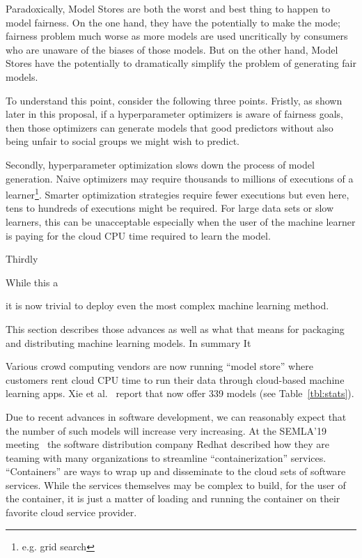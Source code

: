 \documentclass{NSF}
\newcommand{\tbl}[1]{Table~\ref{tbl:#1}}
\begin{document}
\begin{nsfdescription}
Paradoxically,   Model Stores are both the worst and best thing to happen to model fairness. On the one hand, they have the potentially to make the mode; fairness problem much worse as more models are used uncritically
by consumers who are unaware of the biases of those models.
But on the other hand, Model Stores have the potentially to dramatically simplify the problem of generating fair models. 

To understand this point, consider the following three points.
Fristly, as shown later in this proposal, if a hyperparameter optimizers
is aware of fairness goals, then those optimizers can generate models
that good predictors without also being unfair to social groups we might wish to predict.

Secondly,  hyperparameter optimization slows down the process of model generation. Naive optimizers may require thousands to millions of executions of a learner\footnote{e.g. grid search}. Smarter optimization strategies require fewer executions but even here, tens to hundreds of executions might be required. For large data sets or slow learners, this can be unacceptable especially when the user of the machine learner is paying for the cloud CPU time required to learn the model. 

Thirdly


While this a
  
it is now trivial to deploy even
the most complex machine learning method. 

This section
describes those advances as well as what that means
for packaging and distributing machine learning models.
In summary 
It 


  Various crowd computing vendors are now running ``model store'' where customers
  rent cloud CPU time to run their data through cloud-based machine learning apps. Xie et al.~\cite{xiu2019exploratory} report that  
  now offer 339 models (see \tbl{stats}). 
  
Due to recent advances in software development,
we can reasonably expect that the number of such models will increase very    increasing. At the SEMLA'19 meeting~\cite{semla19}
the software distribution company Redhat described how they are
teaming with many organizations to streamline ``containerization'' services. ``Containers'' are ways to wrap up and disseminate to the cloud sets of software services. While the services themselves may be complex to build, for the user of the container, it is just a matter of loading and running the container on their favorite cloud service provider. 


\end{nsfdescription}
\end{document}
